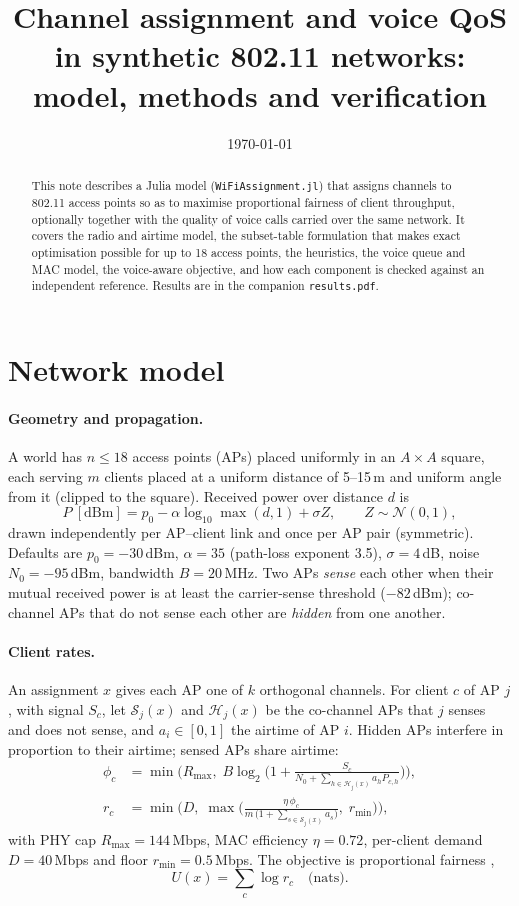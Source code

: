 \documentclass[10pt]{article}
\title{Channel assignment and voice QoS in synthetic 802.11 networks:\\ model, methods and verification}
\author{}
\date{\today}
\newcommand{\code}[1]{\texttt{#1}}
\begin{document}
\maketitle

\begin{abstract}
\noindent This note describes a Julia model (\code{WiFiAssignment.jl}) that assigns channels to 802.11 access points so
as to maximise proportional fairness of client throughput, optionally together with the quality of voice calls carried
over the same network. It covers the radio and airtime model, the subset-table formulation that makes exact optimisation
possible for up to 18 access points, the heuristics, the voice queue and MAC model, the voice-aware objective, and how
each component is checked against an independent reference. Results are in the companion \code{results.pdf}.
\end{abstract}

\section{Network model}

\paragraph{Geometry and propagation.}
A world has $n \le 18$ access points (APs) placed uniformly in an $A \times A$ square, each serving $m$ clients placed at a
uniform distance of 5--15\,m and uniform angle from it (clipped to the square). Received power over distance $d$ is
\[
  P\ [\mathrm{dBm}] = p_0 - \alpha \log_{10}\max(d, 1) + \sigma Z, \qquad Z \sim \mathcal N(0,1),
\]
drawn independently per AP--client link and once per AP pair (symmetric). Defaults are $p_0 = -30$\,dBm, $\alpha = 35$
(path-loss exponent 3.5), $\sigma = 4$\,dB, noise $N_0 = -95$\,dBm, bandwidth $B = 20$\,MHz. Two APs \emph{sense} each
other when their mutual received power is at least the carrier-sense threshold ($-82$\,dBm); co-channel APs that do not
sense each other are \emph{hidden} from one another.

\paragraph{Client rates.}
An assignment $x$ gives each AP one of $k$ orthogonal channels. For client $c$ of AP $j$, with signal $S_c$, let
$\mathcal S_j(x)$ and $\mathcal H_j(x)$ be the co-channel APs that $j$ senses and does not sense, and $a_i \in [0,1]$ the
airtime of AP $i$. Hidden APs interfere in proportion to their airtime; sensed APs share airtime:
\begin{align*}
  \phi_c &= \min\!\Big(R_{\max},\; B \log_2\Big(1 + \frac{S_c}{N_0 + \sum_{h \in \mathcal H_j(x)} a_h P_{c,h}}\Big)\Big), \\
  r_c &= \min\!\Big(D,\; \max\!\Big(\frac{\eta\, \phi_c}{m\,\big(1 + \sum_{s \in \mathcal S_j(x)} a_s\big)},\; r_{\min}\Big)\Big),
\end{align*}
with PHY cap $R_{\max} = 144$\,Mbps, MAC efficiency $\eta = 0.72$, per-client demand $D = 40$\,Mbps and floor
$r_{\min} = 0.5$\,Mbps. The objective is proportional fairness \cite{kelly},
\[
  U(x) = \sum_c \log r_c \quad \text{(nats)}.
\]
\end{document}
